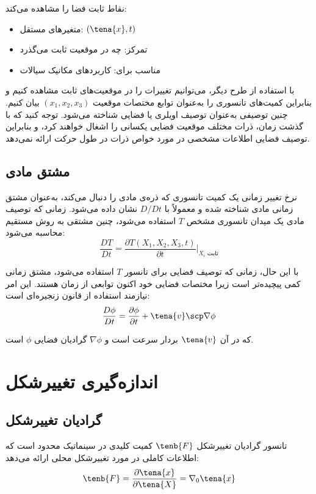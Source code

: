 نقاط ثابت فضا را مشاهده می‌کند:
\begin{itemize}
	\item متغیرهای مستقل: $(\tena{x}, t)$
	\item تمرکز: چه در موقعیت ثابت می‌گذرد
	\item مناسب برای: کاربردهای مکانیک سیالات
\end{itemize}

با استفاده از طرح دیگر، می‌توانیم تغییرات را در موقعیت‌های ثابت مشاهده کنیم و بنابراین کمیت‌های تانسوری را به‌عنوان توابع مختصات موقعیت $(x_1, x_2, x_3)$ بیان کنیم. چنین توصیفی به‌عنوان توصیف اویلری یا فضایی شناخته می‌شود. توجه کنید که با گذشت زمان، ذرات مختلف موقعیت فضایی یکسانی را اشغال خواهند کرد، و بنابراین توصیف فضایی اطلاعات مشخصی در مورد خواص ذرات در طول حرکت ارائه نمی‌دهد.

\subsection{مشتق مادی}

نرخ تغییر زمانی یک کمیت تانسوری که ذره‌ی مادی را دنبال می‌کند، به‌عنوان مشتق زمانی مادی شناخته شده و معمولاً با $D/Dt$ نشان داده می‌شود. زمانی که توصیف مادی یک میدان تانسوری مشخص $T$ استفاده می‌شود، چنین مشتقی به روش مستقیم محاسبه می‌شود:
\begin{equation}
	\frac{DT}{Dt} = \frac{\partial T(X_1, X_2, X_3, t)}{\partial t}\bigg|_{X_i \text{ ثابت}}
\end{equation}

با این حال، زمانی که توصیف فضایی برای تانسور $T$ استفاده می‌شود، مشتق زمانی کمی پیچیده‌تر است زیرا مختصات فضایی خود اکنون توابعی از زمان هستند. این امر نیازمند استفاده از قانون زنجیره‌ای است:
\begin{equation}
	\frac{D\phi}{Dt} = \frac{\partial \phi}{\partial t} + \tena{v} \scp \nabla \phi
\end{equation}

که در آن $\tena{v}$ بردار سرعت است و $\nabla\phi$ گرادیان فضایی $\phi$ است.

\section{اندازه‌گیری تغییرشکل}

\subsection{گرادیان تغییرشکل}

تانسور گرادیان تغییرشکل $\tenb{F}$ کمیت کلیدی در سینماتیک محدود است که اطلاعات کاملی در مورد تغییرشکل محلی ارائه می‌دهد:
\begin{equation}
	\tenb{F} = \frac{\partial \tena{x}}{\partial \tena{X}} = \nabla_0 \tena{x}
\end{equation}

